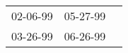 \begin{supertabular}{p{0.33\columnwidth}p{0.33\columnwidth}p{0.33\columnwidth}}
 02-06-99\textsuperscript{} &  05-27-99\textsuperscript{} \\
 03-26-99\textsuperscript{} &  06-26-99\textsuperscript{} \\
\end{supertabular}
